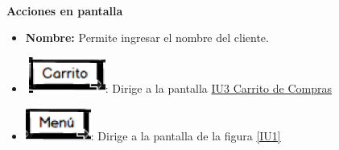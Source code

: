 
\noindent \textbf{\\Acciones en pantalla}

\begin{itemize}
	
	\item \textbf{Nombre:} Permite ingresar el nombre del cliente.
	\item \includegraphics[scale=0.500]{imagenes/iconografia/Carrito.png}: Dirige a la pantalla \hyperlink{IU3}{IU3 Carrito de Compras}
	\item \includegraphics[scale=0.500]{imagenes/iconografia/Menu.png}: Dirige a la pantalla de la figura \ref{IU1}
	
\end{itemize}

